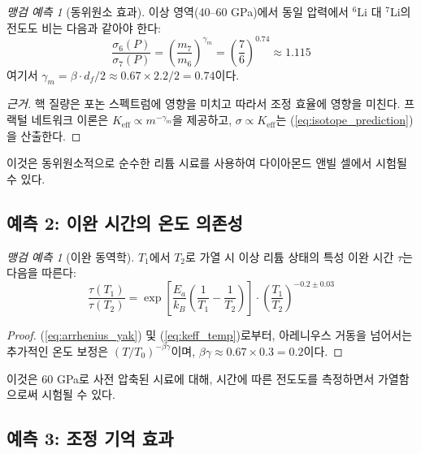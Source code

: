 \documentclass[11pt,a4paper]{article}
\newcommand{\Ke}{K_{\mathrm{eff}}}
\newcommand{\df}{d_{\!f}}
\theoremstyle{remark}
\newtheorem{prediction}[theorem]{맹검 예측}
\begin{document}
	\begin{prediction}[동위원소 효과]
		이상 영역(40–60 GPa)에서 동일 압력에서 \(^6\)Li 대 \(^7\)Li의 전도도 비는 다음과 같아야 한다:
		\begin{equation}
			\frac{\sigma_6(P)}{\sigma_7(P)} = \left( \frac{m_7}{m_6} \right)^{\gamma_m} = \left( \frac{7}{6} \right)^{0.74} \approx 1.115
			\label{eq:isotope_prediction}
		\end{equation}
		여기서 \(\gamma_m = \beta \cdot \df / 2 \approx 0.67 \times 2.2 / 2 = 0.74\)이다.
		\label{pred:isotope}
	\end{prediction}
	
	\begin{proof}[근거]
		핵 질량은 포논 스펙트럼에 영향을 미치고 따라서 조정 효율에 영향을 미친다. 프랙털 네트워크 이론은 \(\Ke \propto m^{-\gamma_m}\)을 제공하고, \(\sigma \propto \Ke\)는 (\ref{eq:isotope_prediction})을 산출한다.
	\end{proof}
	
	이것은 동위원소적으로 순수한 리튬 시료를 사용하여 다이아몬드 앤빌 셀에서 시험될 수 있다.
	
	\subsection{예측 2: 이완 시간의 온도 의존성}
	
	\begin{prediction}[이완 동역학]
		\(T_1\)에서 \(T_2\)로 가열 시 이상 리튬 상태의 특성 이완 시간 \(\tau\)는 다음을 따른다:
		\begin{equation}
			\frac{\tau(T_1)}{\tau(T_2)} = \exp\left[ \frac{E_a}{k_B} \left( \frac{1}{T_1} - \frac{1}{T_2} \right) \right] \cdot \left( \frac{T_1}{T_2} \right)^{-0.2 \pm 0.03}
			\label{eq:relaxation_prediction}
		\end{equation}
		\label{pred:relaxation}
	\end{prediction}
	
	\begin{proof}
		(\ref{eq:arrhenius_yak}) 및 (\ref{eq:keff_temp})로부터, 아레니우스 거동을 넘어서는 추가적인 온도 보정은 \((T/T_0)^{-\beta\gamma}\)이며, \(\beta\gamma \approx 0.67 \times 0.3 = 0.2\)이다.
	\end{proof}
	
	이것은 60 GPa로 사전 압축된 시료에 대해, 시간에 따른 전도도를 측정하면서 가열함으로써 시험될 수 있다.
	
	\subsection{예측 3: 조정 기억 효과}
	
\end{document}
